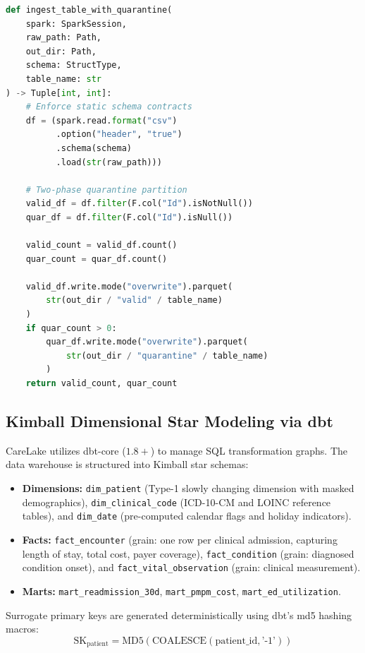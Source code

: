 \documentclass[10pt,journal,compsoc]{IEEEtran}
\begin{document}
\begin{lstlisting}[language=Python, caption={PySpark Two-Phase Quarantine Ingestion.}, label={lst:pyspark}]
def ingest_table_with_quarantine(
    spark: SparkSession,
    raw_path: Path,
    out_dir: Path,
    schema: StructType,
    table_name: str
) -> Tuple[int, int]:
    # Enforce static schema contracts
    df = (spark.read.format("csv")
          .option("header", "true")
          .schema(schema)
          .load(str(raw_path)))

    # Two-phase quarantine partition
    valid_df = df.filter(F.col("Id").isNotNull())
    quar_df = df.filter(F.col("Id").isNull())

    valid_count = valid_df.count()
    quar_count = quar_df.count()

    valid_df.write.mode("overwrite").parquet(
        str(out_dir / "valid" / table_name)
    )
    if quar_count > 0:
        quar_df.write.mode("overwrite").parquet(
            str(out_dir / "quarantine" / table_name)
        )
    return valid_count, quar_count
\end{lstlisting}

\subsection{Kimball Dimensional Star Modeling via dbt}
CareLake utilizes dbt-core ($1.8+$) to manage SQL transformation graphs. The data warehouse is structured into Kimball star schemas:
\begin{itemize}
    \item \textbf{Dimensions:} \texttt{dim\_patient} (Type-1 slowly changing dimension with masked demographics), \texttt{dim\_clinical\_code} (ICD-10-CM and LOINC reference tables), and \texttt{dim\_date} (pre-computed calendar flags and holiday indicators).
    \item \textbf{Facts:} \texttt{fact\_encounter} (grain: one row per clinical admission, capturing length of stay, total cost, payer coverage), \texttt{fact\_condition} (grain: diagnosed condition onset), and \texttt{fact\_vital\_observation} (grain: clinical measurement).
    \item \textbf{Marts:} \texttt{mart\_readmission\_30d}, \texttt{mart\_pmpm\_cost}, \texttt{mart\_ed\_utilization}.
\end{itemize}

Surrogate primary keys are generated deterministically using dbt's md5 hashing macros:
\begin{equation}
\text{SK}_{\text{patient}} = \text{MD5}(\text{COALESCE}(\text{patient\_id}, \text{'-1'}))
\end{equation}
\end{document}
